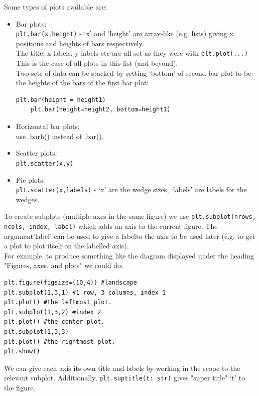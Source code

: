 \documentclass[8pt]{extarticle}
\begin{document}
\begin{multicols}{4}
\columnbreak

Some types of plots available are:
\begin{itemize}
    \item Bar plots:\\    
    \lstinline[style=Python]
    !plt.bar(x,height)! - `x' and `height' are array-like (e.g. lists) giving x positions and heights of bars respectively. \\
    
    The title, x-labels, y-labels etc are all set as they were with \lstinline[style=Python]!plt.plot(...)! This is the case of all plots in this list (and beyond).\\
    
    Two sets of data can be stacked by setting `bottom' of second bar plot to be the heights of the bars of the first bar plot:

    \begin{lstlisting}[style=Python]
    plt.bar(height = height1)
    plt.bar(height=height2, bottom=height1)
    \end{lstlisting} 

    \item Horizontal bar plots:\\
    use .barh() instead of .bar().

    \item Scatter plots:\\
    \lstinline[style=Python]
    !plt.scatter(x,y)!
    
    \item Pie plots:\\
    \lstinline[style=Python]
    !plt.scatter(x,labels)! - `x' are the wedge sizes, `labels' are labels for the wedges.
\end{itemize}

To create subplots (multiple axes in the same figure) we use \lstinline[style=Python]!plt.subplot(nrows, ncols, index, label)! which adds an axis to the current figure. The argument`label' can be used to give a labelto the axis to be used later (e.g. to get a plot to plot itself on the labelled axis).\\

For example, to produce something like the diagram displayed under the heading "Figures, axes, and plots" we could do:
\begin{lstlisting}[style=Python]
plt.figure(figsize=(10,4)) #landscape
plt.subplot(1,3,1) #1 row, 3 columns, index 1
plt.plot() #the leftmost plot.
plt.subplot(1,3,2) #index 2
plt.plot() #the center plot.
plt.subplot(1,3,3) 
plt.plot() #the rightmost plot.
plt.show()
\end{lstlisting}
We can give each axis its own title and labels by working in the scope to the relevant subplot. Additionally, \lstinline[style=Python]!plt.suptitle(t: str)! gives "super title" `t' to the figure.\\


\end{multicols}
\end{document}
